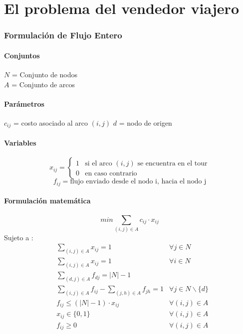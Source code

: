 \documentclass{article}
\numberwithin{equation}{section}
\begin{document}
\newpage
\part{El problema del vendedor viajero}
\section{Formulación de Flujo Entero}
\subsection{Conjuntos}
$N$ = Conjunto de nodos\\
$A$ = Conjunto de arcos
\subsection{Parámetros}
$c_{ij}$ = costo asociado al arco $(i,j)$
$d$ = nodo de origen
\subsection{Variables}
\begin{flushleft}
\[x_{ij}={\begin{cases}1&{\mbox{si el arco $(i,j)$ se encuentra en el tour}}\\0&{\mbox{en caso contrario}}\end{cases}}
\]
\[f_{ij} = \mbox{flujo enviado desde el nodo i, hacia el nodo j}\]
\end{flushleft}
\subsection{Formulación matemática}
\begin{equation}
min \sum_{(i,j) \in A} c_{ij} \cdot x_{ij}
\end{equation}
Sujeto a : \begin{align}
& \sum_{(i,j) \in A} x_{ij} = 1 &\forall j \in N \\
& \sum_{(i,j) \in A} x_{ij} = 1 &\forall i \in N \\
& \sum_{(d,j) \in A} f_{dj} = |N| - 1 \\
& \sum_{(i,j) \in A} f_{ij} - \sum_{(j,h) \in A} f_{jh} = 1 &\forall j \in N \backslash \{d\} \\
& f_{ij} \leq (|N| - 1) \cdot  x_{ij} & \forall (i,j) \in A\\
& x_{ij} \in \{0,1\} &\forall (i,j) \in A\\
& f_{ij} \geq 0 &\forall (i,j) \in A
\end{align}
\end{document}
